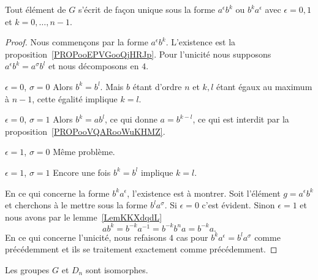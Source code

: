 \begin{lemma}        \label{LemooNFRIooPWuikH}
    Tout élément de \( G\) s'écrit de façon unique sous la forme \( a^{\epsilon}b^k\) ou \( b^ka^{\epsilon}\) avec \( \epsilon=0,1\) et \( k=0,\ldots, n-1\).
\end{lemma}

\begin{proof}
    Nous commençons par la forme \( a^{\epsilon}b^k\). L'existence est la proposition~\ref{PROPooEPVGooQjHRJp}. Pour l'unicité nous supposons \( a^{\epsilon}b^k=a^{\sigma}b^l\) et nous décomposons en \( 4\).
    \begin{subproof}
        \item[\( \epsilon=0\), \( \sigma=0\)]
            Alors \( b^k=b^l\). Mais \( b\) étant d'ordre \( n\) et \( k,l\) étant égaux au maximum à \( n-1\), cette égalité implique \( k=l\).
        \item[\( \epsilon=0\), \( \sigma=1\)]
            Alors \( b^k=ab^l\), ce qui donne \( a=b^{k-l}\), ce qui est interdit par la proposition~\ref{PROPooVQARooWuKHMZ}.
        \item[\( \epsilon=1\), \( \sigma=0\)]
            Même problème.
        \item[\( \epsilon=1\), \( \sigma=1\)]
            Encore une fois \( b^k=b^l\) implique \( k=l\).
    \end{subproof}
    En ce qui concerne la forme \( b^ka^{\epsilon}\), l'existence est à montrer. Soit l'élément \( g=a^{\epsilon}b^k\) et cherchons à le mettre sous la forme \( b^la^{\sigma}\). Si \( \epsilon=0\) c'est évident. Sinon \( \epsilon=1\) et nous avons par le lemme~\ref{LemKKXdqdL}
    \begin{equation}
        ab^k=b^{-k}a^{-1}=b^{-k}b^na=b^{-k}a.
    \end{equation}
    En ce qui concerne l'unicité, nous refaisons \( 4\) cas pour \( b^ka^{\epsilon}=b^la^{\sigma}\) comme précédemment et ils se traitement exactement comme précédemment.
\end{proof}

\begin{theorem}     \label{THOooYITHooTNTBuG}
    Les groupes \( G\) et \( D_n\) sont isomorphes.
\end{theorem}

